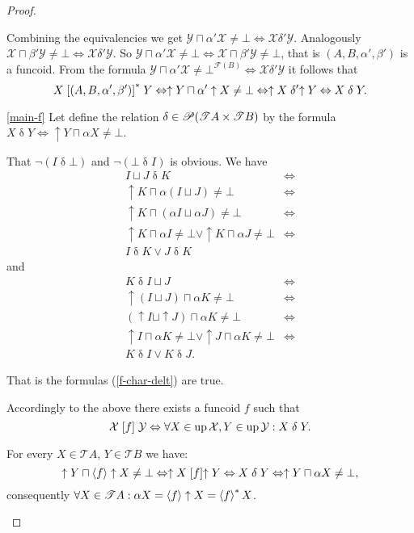 \begin{proof}
\begin{widedisorder}
Combining the equivalencies we get
$\mathcal{Y}\sqcap\alpha'\mathcal{X}\ne\bot
\Leftrightarrow\mathcal{X}\mathrel{\delta'}\mathcal{Y}$.
Analogously
$\mathcal{X}\sqcap\beta'\mathcal{Y}\ne\bot
\Leftrightarrow\mathcal{X}\mathrel{\delta'}\mathcal{Y}$.
So
$\mathcal{Y}\sqcap\alpha'\mathcal{X}\ne\bot
\Leftrightarrow\mathcal{X}\sqcap\beta'\mathcal{Y}\ne\bot$,
that is $(A,B,\alpha',\beta')$ is a funcoid. From the formula
$\mathcal{Y}\sqcap\alpha'\mathcal{X}\ne\bot^{\mathscr{F}(B)}
\Leftrightarrow\mathcal{X}\mathrel{\delta'}\mathcal{Y}$
it follows that
\[
X\mathrel{\left[(A,B,\alpha',\beta')\right]^{\ast}}Y\Leftrightarrow\uparrow Y\sqcap\alpha'\uparrow
X\ne\bot\Leftrightarrow\uparrow X\mathrel{\delta'}\uparrow
Y\Leftrightarrow X\mathrel\delta Y.
\]


\item [{\ref{main-f}}] Let define the relation
$\delta\in\mathscr{P}(\mathscr{T}A\times\mathscr{T}B)$
by the formula $X\mathrel\delta Y\Leftrightarrow\uparrow Y\sqcap\alpha
X\ne\bot$.


That $\lnot(I\mathrel\delta\bot)$ and
$\lnot(\bot\mathrel\delta I)$
is obvious. We have
\begin{align*}
I\sqcup J\mathrel\delta K & \Leftrightarrow\\
\uparrow K\sqcap\alpha(I\sqcup J)\ne\bot & \Leftrightarrow\\
\uparrow K\sqcap(\alpha I\sqcup\alpha J)\ne\bot &
\Leftrightarrow\\
\uparrow K\sqcap\alpha I\ne\bot\lor\uparrow K\sqcap\alpha
J\ne\bot & \Leftrightarrow\\
I\mathrel\delta K\lor J\mathrel\delta K
\end{align*}
and
\begin{align*}
K\mathrel\delta I\sqcup J & \Leftrightarrow\\
\uparrow(I\sqcup J)\sqcap\alpha K\ne\bot & \Leftrightarrow\\
(\uparrow I\sqcup\uparrow J)\sqcap\alpha K\ne\bot &
\Leftrightarrow\\
\uparrow I\sqcap\alpha K\ne\bot\lor\uparrow J\sqcap\alpha
K\ne\bot & \Leftrightarrow\\
K\mathrel\delta I\lor K\mathrel\delta J.
\end{align*}



That is the formulas (\ref{f-char-delt}) are true.


Accordingly to the above there exists a funcoid $f$ such that
\[
\mathcal{X}\mathrel{\left[f\right]}\mathcal{Y}\Leftrightarrow\forall
X\in\operatorname{up}\mathcal{X},Y\in\operatorname{up}\mathcal{Y}:X\mathrel\delta Y.
\]



For every $X\in\mathscr{T}A$, $Y\in\mathscr{T}B$ we have:
\[
\uparrow Y\sqcap\left\langle f\right\rangle\uparrow
X\ne\bot\Leftrightarrow\uparrow X\mathrel{\left[f\right]}\uparrow
Y\Leftrightarrow X\mathrel\delta Y\Leftrightarrow\uparrow Y\sqcap\alpha
X\ne\bot,
\]
consequently $\forall X\in\mathscr{T}A:\alpha X=\left\langle f\right\rangle\uparrow X=\left\langle f\right\rangle ^{\ast}X$.

\end{widedisorder}
\end{proof}

